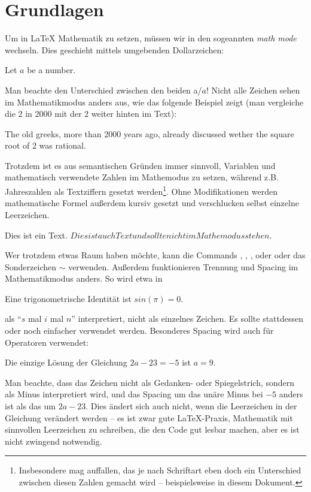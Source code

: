 \section{Grundlagen}
Um in \LaTeX{} Mathematik zu setzen, müssen wir in den sogeannten \emph{math mode} wechseln.
Dies geschieht mittels umgebenden Dollarzeichen:
\begin{latexlisting}
	Let $a$ be a number.
\end{latexlisting}
Man beachte den Unterschied zwischen den beiden a/$a$!
Nicht alle Zeichen sehen im Mathematikmodus anders aus, wie das folgende Beispiel zeigt (man vergleiche die 2 in 2000 mit der $2$ weiter hinten im Text):
\begin{latexlisting}
	The old greeks, more than 2000 years ago, already discussed wether the square root of $2$ was rational.
\end{latexlisting}
Trotzdem ist es aus semantischen Gründen immer sinnvoll, Variablen und mathematisch verwendete Zahlen im Mathemodus zu setzen, während z.B. Jahreszahlen als Textziffern gesetzt werden\footnote{Insbesondere mag auffallen, das je nach Schriftart eben doch ein Unterschied zwischen diesen Zahlen gemacht wird -- beispielsweise in diesem Dokument.}.
Ohne Modifikationen werden mathematische Formel außerdem kursiv gesetzt und verschlucken selbst einzelne Leerzeichen.
\begin{latexlisting}
	Dies ist ein Text. $Dies     ist auch Text und sollte nicht im Mathemodus stehen.$
\end{latexlisting}
Wer trotzdem etwas Raum haben möchte, kann die Commands , \latexcommand{,}, \latexcommand{ },  oder  oder das Sonderzeichen $\sim$ verwenden.
Außerdem funktionieren Trennung und Spacing im Mathematikmodus anders. So wird etwa  in
\begin{latexlisting}
	Eine trigonometrische Identität ist $sin(\pi) = 0$.
\end{latexlisting}
als \enquote{$s$ mal $i$ mal $n$} interpretiert, nicht als einzelnes Zeichen.
Es sollte stattdessen  oder noch einfacher  verwendet werden.
Besonderes Spacing wird auch für Operatoren verwendet:
\begin{latexlisting}
	Die einzige Lösung der Gleichung $2a - 23 = -5$ ist $a = 9$.
\end{latexlisting}
Man beachte, dass das Zeichen \key{-} nicht als Gedanken- oder Spiegelstrich, sondern als Minus interpretiert wird, und das Spacing um das unäre Minus bei $-5$ anders ist als das um $2a - 23$.
Dies ändert sich auch nicht, wenn die Leerzeichen in der Gleichung verändert werden -- es ist zwar gute \LaTeX{}-Praxis, Mathematik mit sinnvollen Leerzeichen zu schreiben, die den Code gut lesbar machen, aber es ist nicht zwingend notwendig.

